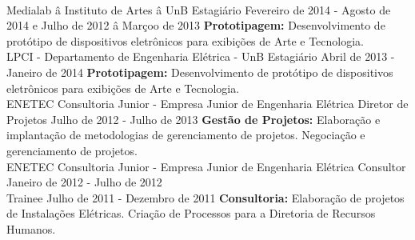 \documentclass[a4paper]{twentysecondcv} %
\begin{document}
\begin{twenty}
{            \color{pblue}{\hspace{8pt}-\hspace{4pt}} 
        }
        \\
    \twentyitem
    	{Medialab â Instituto de Artes â UnB}
		{Estagiário}
		{Fevereiro de 2014 - Agosto de 2014 e Julho de 2012 â Marçoo de 2013}
        {
            \color{pblue}{\hspace{8pt}-\hspace{4pt}} \color{black}\textbf{
            Prototipagem: }Desenvolvimento de protótipo de dispositivos 
            eletrônicos para exibições de Arte e Tecnologia.
        }
        \\
    \twentyitem
    {LPCI - Departamento de Engenharia Elétrica - UnB}
    {Estagiário}
    {Abril de 2013 - Janeiro de 2014}
    {
        \color{pblue}{\hspace{8pt}-\hspace{4pt}} \color{black}\textbf{
        Prototipagem: }Desenvolvimento de protótipo de dispositivos eletrônicos 
        para exibições de Arte e Tecnologia.
    }
    \\
    \twentyitem
    {ENETEC Consultoria Junior - Empresa Junior de Engenharia Elétrica}
    {Diretor de Projetos}
    {Julho de 2012 - Julho de 2013}
    {\color{pblue}{\hspace{8pt}-\hspace{4pt}} \color{black}\textbf{Gestão de 
    Projetos: }Elaboração e implantação de metodologias de gerenciamento de 
    projetos. Negociação e gerenciamento de projetos.}
    \\
    \twentyitem
    {ENETEC Consultoria Junior - Empresa Junior de Engenharia Elétrica}
    {Consultor \hfill Janeiro de 2012 - Julho de 2012\\}
    {Trainee  \hfill Julho de 2011 - Dezembro de 2011}
    {\color{pblue}{\hspace{8pt}-\hspace{4pt}} \color{black}\textbf{Consultoria: }
    Elaboração de projetos de Instalações Elétricas. Criação de Processos para a 
    Diretoria de Recursos Humanos.}
\end{twenty}

\end{document}
